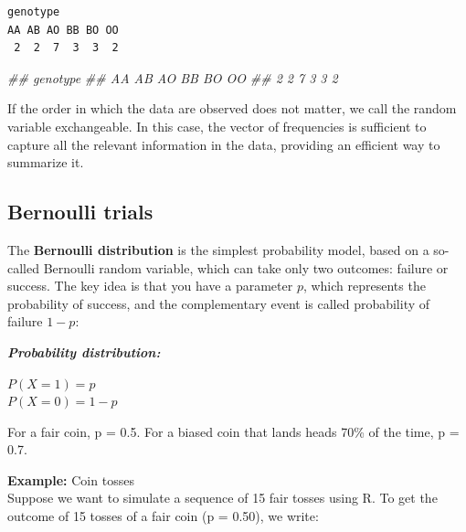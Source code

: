 \documentclass[
  letterpaper,
  DIV=11,
  numbers=noendperiod]{scrreprt}
\newenvironment{Shaded}{\begin{snugshade}}{\end{snugshade}}
\newcommand{\DocumentationTok}[1]{\textcolor[rgb]{0.37,0.37,0.37}{\textit{#1}}}
\begin{document}
\begin{verbatim}
genotype
AA AB AO BB BO OO 
 2  2  7  3  3  2 
\end{verbatim}

\begin{Shaded}
\begin{Highlighting}[]
\DocumentationTok{\#\# genotype}
\DocumentationTok{\#\# AA AB AO BB BO OO }
\DocumentationTok{\#\# 2  2  7  3  3  2 }
\end{Highlighting}
\end{Shaded}

If the order in which the data are observed does not matter, we call the
random variable exchangeable. In this case, the vector of frequencies is
sufficient to capture all the relevant information in the data,
providing an efficient way to summarize it.

\subsection{Bernoulli trials}\label{bernoulli-trials}

The \textbf{Bernoulli distribution} is the simplest probability model,
based on a so-called Bernoulli random variable, which can take only two
outcomes: failure or success. The key idea is that you have a parameter
\(p\), which represents the probability of success, and the
complementary event is called probability of failure \(1-p\):

\textbf{\emph{Probability distribution:}}

\(P(X=1) = p\)\\
\(P(X=0) = 1-p\)

For a fair coin, p = 0.5. For a biased coin that lands heads 70\% of the
time, p = 0.7.

\begin{tcolorbox}[enhanced jigsaw, arc=.35mm, bottomrule=.15mm, bottomtitle=1mm, breakable, colback=white, colbacktitle=quarto-callout-note-color!10!white, colframe=quarto-callout-note-color-frame, coltitle=black, left=2mm, leftrule=.75mm, opacityback=0, opacitybacktitle=0.6, rightrule=.15mm, title={Note}, titlerule=0mm, toprule=.15mm, toptitle=1mm]

\textbf{Example:} Coin tosses\\
Suppose we want to simulate a sequence of 15 fair tosses using R. To get
the outcome of 15 tosses of a fair coin (p = 0.50), we write:

\end{tcolorbox}
\end{document}
